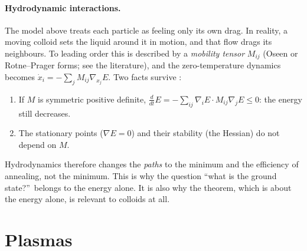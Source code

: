 \paragraph{Hydrodynamic interactions.} The model above treats each particle as feeling only its own drag.
In reality, a moving colloid sets the liquid around it in motion, and that flow drags its neighbours. To leading
order this is described by a \emph{mobility tensor} $M_{ij}$ (Oseen or Rotne--Prager forms; see the literature),
and the zero-temperature dynamics becomes $\dot x_i = -\sum_j M_{ij}\nabla_{x_j}E$. Two facts survive \tierC:
\begin{enumerate}
\item If $M$ is symmetric positive definite, $\frac{d}{dt}E = -\sum_{ij}\nabla_iE\cdot M_{ij}\nabla_jE\le0$: the
energy still decreases.
\item The stationary points ($\nabla E = 0$) and their stability (the Hessian) do not depend on $M$.
\end{enumerate}
Hydrodynamics therefore changes the \emph{paths} to the minimum and the efficiency of annealing, not the
minimum. This is why the question ``what is the ground state?''\ belongs to the energy alone. It is also why the
theorem, which is about the energy alone, is relevant to colloids at all.

\section{Plasmas}\label{sec:ch4-plasmas}

